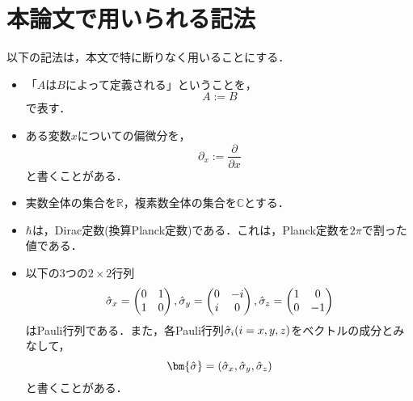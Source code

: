\section{本論文で用いられる記法}
以下の記法は，本文で特に断りなく用いることにする．\\
\begin{itemize} 
  \item
    「$A$は$B$によって定義される」ということを，
    \begin{equation}
      A := B
    \end{equation}
    で表す．
  \item
    ある変数$x$についての偏微分を，
    \begin{equation}
      \partial_x := \frac{\partial}{\partial x}
    \end{equation}
    と書くことがある．
  \item 実数全体の集合を$\mathbb{R}$，複素数全体の集合を$\mathbb{C}$とする．
  \item $\hbar$は，Dirac定数(換算Planck定数)である．これは，Planck定数を$2\pi$で割った値である．
  \item 以下の3つの$2\times2$行列
\begin{equation}
  \Hat{\sigma}_x=
  \begin{pmatrix}
    0 & 1\\
    1 & 0\\
  \end{pmatrix}
  ,
  \Hat{\sigma}_y=
  \begin{pmatrix}
    0 & -i\\
    i & 0\\
  \end{pmatrix}
  ,
  \Hat{\sigma}_z=
  \begin{pmatrix}
    1 & 0\\
    0 & -1\\
  \end{pmatrix}
\end{equation}
はPauli行列である．また，各Pauli行列$\Hat{\sigma}_i (i = x,y,z)$をベクトルの成分とみなして，
\begin{equation}
  \bm{\Hat{\sigma}} = (\Hat{\sigma}_x, \Hat{\sigma}_y, \Hat{\sigma}_z)
\end{equation}
と書くことがある．
\end{itemize}